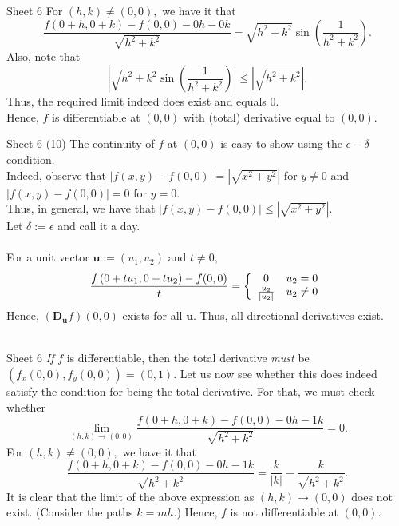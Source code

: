 \documentclass[handout, aspectratio=169]{beamer}
\begin{document}
\begin{frame}{Sheet 6}
	For $(h,k) \neq (0,0),$ we have it that
	\[\frac{f\left(0+h, 0+k\right)-f\left(0, 0\right)-0 h-0 k}{\sqrt{h^{2}+k^{2}}} = \sqrt{h^2 + k^2}\sin\left(\frac{1}{h^2 + k^2}\right).\]
	Also, note that
	\[\left|\sqrt{h^2 + k^2}\sin\left(\frac{1}{h^2 + k^2}\right)\right| \le \left|\sqrt{h^2 + k^2}\right|.\]
	Thus, the required limit indeed does exist and equals $0.$\\
	Hence, $f$ is differentiable at $(0,0)$ with (total) derivative equal to $(0, 0).$
\end{frame}

\begin{frame}{Sheet 6}
	(10) The continuity of $f$ at $(0, 0)$ is easy to show using the $\epsilon-\delta$ condition.\\
	Indeed, observe that $|f(x, y) - f(0, 0)| = \left|\sqrt{x^2 + y^2}\right|$ for $y \neq 0$ and $|f(x, y) - f(0, 0)| = 0$ for $y = 0.$\\
	Thus, in general, we have that $|f(x, y) - f(0, 0)| \le \left|\sqrt{x^2 + y^2}\right|.$ \\
	Let $\delta := \epsilon$ and call it a day.\\~\\
	For a unit vector $\textbf{u} := (u_1, u_2)$ and $t \neq 0,$
	\[\frac{f\left(0+t u_{1}, 0+t u_{2}\right)-f(0,0)}{t} = \left\{
		\begin{array}{c c}
			0 & u_2 = 0\\
			\frac{u_2}{|u_2|} & u_2 \neq 0
		\end{array}
	\right.\]
	Hence, $\left(\mathbf{D_u} f\right)(0,0)$ exists for all $\textbf{u}.$ Thus, all directional derivatives exist.\\~\\
\end{frame}
\begin{frame}{Sheet 6}
	\emph{If} $f$ is differentiable, then the total derivative \emph{must} be $(f_x(0, 0), f_y(0, 0)) = (0, 1).$ Let us now see whether this does indeed satisfy the condition for being the total derivative. For that, we must check whether
	\[\lim _{(h, k) \rightarrow(0,0)} \frac{f\left(0+h, 0+k\right)-f\left(0, 0\right)-0 h- 1k}{\sqrt{h^{2}+k^{2}}}=0.\]
	For $(h,k) \neq (0,0),$ we have it that
	\[\frac{f\left(0+h, 0+k\right)-f\left(0, 0\right)-0 h- 1k}{\sqrt{h^{2}+k^{2}}} = \frac{k}{|k|} - \dfrac{k}{\sqrt{h^2 + k^2}}.\]
	It is clear that the limit of the above expression as $(h, k) \to (0, 0)$ does not exist. (Consider the paths $k = mh.$) Hence, $f$ is not differentiable at $(0, 0).$
\end{frame}
\end{document}
